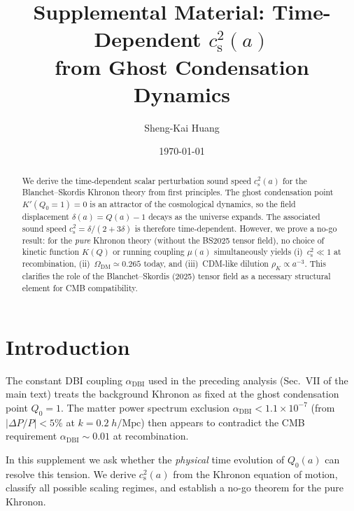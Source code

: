 \documentclass[prd,twocolumn,superscriptaddress,longbibliography,floatfix]{revtex4-2}
\newcommand{\cs}{c_{\mathrm{s}}}
\begin{document}
\title{Supplemental Material: Time-Dependent $\cs^2(a)$\\
from Ghost Condensation Dynamics}

\author{Sheng-Kai Huang}

\date{\today}

\begin{abstract}
We derive the time-dependent scalar perturbation sound speed
$\cs^2(a)$ for the Blanchet--Skordis Khronon theory from first
principles.  The ghost condensation point $K'(Q_0{=}1) = 0$
is an attractor of the cosmological dynamics, so the field
displacement $\delta(a) = Q(a) - 1$ decays as the universe
expands.  The associated sound speed
$\cs^2 = \delta/(2{+}3\delta)$ is therefore time-dependent.
However, we prove a no-go result: for the \emph{pure}
Khronon theory (without the BS2025 tensor field), no choice
of kinetic function $K(Q)$ or running coupling $\mu(a)$
simultaneously yields (i)~$\cs^2 \ll 1$ at recombination,
(ii)~$\Omega_{\mathrm{DM}} \simeq 0.265$ today, and
(iii)~CDM-like dilution $\rho_K \propto a^{-3}$.
This clarifies the role of the Blanchet--Skordis
(2025) tensor field as a necessary structural element for
CMB compatibility.
\end{abstract}

\maketitle


\section{Introduction}
\label{sec:intro}

The constant DBI coupling $\alpha_{\mathrm{DBI}}$ used in
the preceding analysis (Sec.~VII of the main text) treats
the background Khronon as fixed at the ghost condensation
point $Q_0 = 1$.  The matter power spectrum exclusion
$\alpha_{\mathrm{DBI}} < 1.1 \times 10^{-7}$ (from
$|\Delta P/P| < 5\%$ at $k = 0.2\;h/\mathrm{Mpc}$) then
appears to contradict the CMB requirement
$\alpha_{\mathrm{DBI}} \sim 0.01$ at recombination.

In this supplement we ask whether the \emph{physical}
time evolution of $Q_0(a)$ can resolve this tension.  We
derive $\cs^2(a)$ from the Khronon equation of motion,
classify all possible scaling regimes, and establish a
no-go theorem for the pure Khronon.
\end{document}
